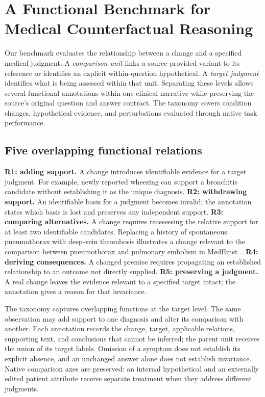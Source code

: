 \section{A Functional Benchmark for Medical Counterfactual Reasoning}
\label{sec:benchmark}

Our benchmark evaluates the relationship between a change and a specified medical judgment. A \emph{comparison unit} links a source-provided variant to its reference or identifies an explicit within-question hypothetical. A \emph{target judgment} identifies what is being assessed within that unit. Separating these levels allows several functional annotations within one clinical narrative while preserving the source's original question and answer contract. The taxonomy covers condition changes, hypothetical evidence, and perturbations evaluated through native task performance.

\subsection{Five overlapping functional relations}

\textbf{R1: adding support.} A change introduces identifiable evidence for a target judgment. For example, newly reported wheezing can support a bronchitis candidate without establishing it as the unique diagnosis. \textbf{R2: withdrawing support.} An identifiable basis for a judgment becomes invalid; the annotation states which basis is lost and preserves any independent support. \textbf{R3: comparing alternatives.} A change requires reassessing the relative support for at least two identifiable candidates. Replacing a history of spontaneous pneumothorax with deep-vein thrombosis illustrates a change relevant to the comparison between pneumothorax and pulmonary embolism in MedEinst~\cite{chen2026medeinst}. \textbf{R4: deriving consequences.} A changed premise requires propagating an established relationship to an outcome not directly supplied. \textbf{R5: preserving a judgment.} A real change leaves the evidence relevant to a specified target intact; the annotation gives a reason for that invariance.

The taxonomy captures overlapping functions at the target level. The same observation may add support to one diagnosis and alter its comparison with another. Each annotation records the change, target, applicable relations, supporting text, and conclusions that cannot be inferred; the parent unit receives the union of its target labels. Omission of a symptom does not establish its explicit absence, and an unchanged answer alone does not establish invariance. Native comparison axes are preserved: an internal hypothetical and an externally edited patient attribute receive separate treatment when they address different judgments.

